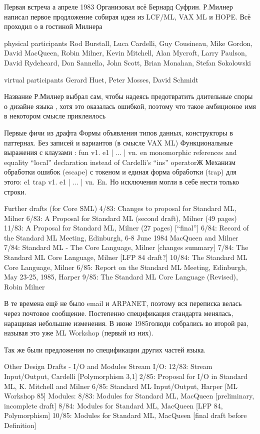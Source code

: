 \documentclass[14pt]{matmex-diploma-custom}
\begin{document}
Первая встреча а апреле 1983
Организовал всё Бернард Суфрин. Р.Милнер написал первое продложение  собирая идеи из LCF/ML, VAX ML и HOPE. Всё проходил о в гостиной Милнера

physical participants
Rod Burstall, Luca Cardelli, Guy Cousineau, Mike Gordon, David MacQueen, Robin Milner, Kevin Mitchell, Alan Mycroft, Larry Paulson, David Rydeheard, Don Sannella, John Scott, Brian Monahan, Stefan Sokolowski

virtual participants
Gerard Huet, Peter Mosses, David Schmidt

Название Р.Милнер выбрал сам, чтобы надеясь предотвратить длительные споры о дизайне языка , хотя это оказалась ошибкой, поэтому что такое амбиционое имя в некотором смысле приклеилось

Первые фичи из драфта
Формы объявления типов данных, конструкторы в паттернах.
Без записей и вариантов (в смысле VAX ML)
Функциональные выражения с клаузами :  fun v1. e1 | ... | vn. en
monomorphic references and equality
“local” declaration instead of Cardelli’s “ins” operatorЖ
Механизм обработки ошибок (escape) с токеном и единая форма обработки (trap) для этого:
e1 trap v1. e1 | ... | vn. En. Но исключения могли в себе нести только строки.


Further drafts (for Core SML)
4/83: Changes to proposal for Standard ML, Milner
6/83: A Proposal for Standard ML (second draft), Milner (49 pages)
11/83: A Proposal for Standard ML, Milner (27 pages) [“final”]
6/84: Record of the Standard ML Meeting, Edinburgh, 6-8 June 1984
MacQueen and Milner
7/84: Standard ML - The Core Language, Milner [changes summary]
7/84: The Standard ML Core Language, Milner [LFP 84 draft?]
10/84: The Standard ML Core Language, Milner
6/85: Report on the Standard ML Meeting, Edinburgh, May 23-25, 1985, Harper
9/85: The Standard ML Core Language (Revised), Robin Milner

В те времена ещё не было email и ARPANET, поэтому вся переписка велась через почтовое сообщение. Постепенно спецификация стандарта менялась, наращивая небольшие изменения. В июне 1985голюди собрались во второй раз, называя это уже ML Workshop (первый из них).

Так же были предложения по спецификации  других частей языка.

Other Design Drafts - I/O and Modules
Stream I/O:
12/83: Stream Input/Output, Cardelli [Polymorphism 3,1]
2/85: Proposal for I/O in Standard ML, K. Mitchell and Milner
6/85: Standard ML Input/Output, Harper [ML Workshop 85]
Modules:
8/83: Modules for Standard ML, MacQueen [preliminary, incomplete draft]
8/84: Modules for Standard ML, MacQueen [LFP 84, Polymorphism]
10/85: Modules for Standard ML, MacQueen [final draft before Definition]
\end{document}
